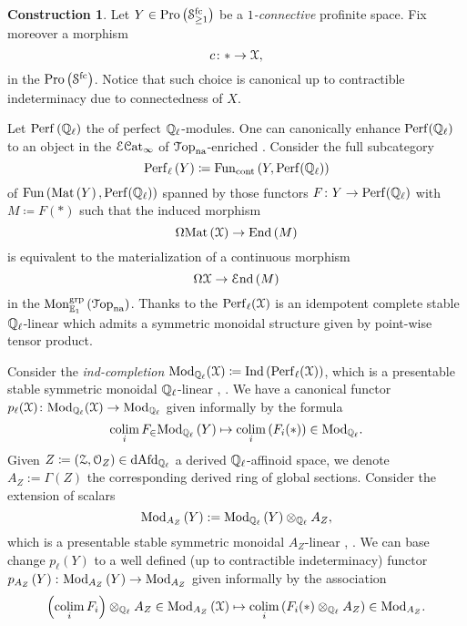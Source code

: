 \documentclass[10pt,a4paper]{amsart}
\numberwithin{equation}{subsection}
\theoremstyle{plain}
\theoremstyle{definition}
\newtheorem{construction}[theorem]{Construction}
\theoremstyle{remark}
\numberwithin{equation}{section}
\begin{document}
\begin{construction} \label{const:mod}
Let $Y \in \mathrm{Pro} \left( \mathcal S_{\geq 1}^{\mathrm{fc}} \right)$ be a \emph{$1$-connective} profinite space. Fix moreover a morphism
	\[
		c \colon * \to \mathcal X,
	\]
in the \infcat $\mathrm{Pro} \left( \mathcal S^{\mathrm{fc}} \right)$. Notice that such choice is canonical up to contractible indeterminacy due to connectedness of $X$.

Let $\mathrm{Perf} \left( \mathbb{Q}_{\ell} \right)$ the \infcat of perfect $\mathbb{Q}_{\ell}$-modules. One can canonically enhance $\mathrm{Perf}(\mathbb{Q}_{\ell})$ to an object in the \infcat $\mathcal E \mathcal{C}\mathrm{at}_\infty$ of $\mathcal{T} \mathrm{op}_{\mathrm{na}}$-enriched \infcats. Consider the full subcategory	
	\[
		\mathrm{Perf}_{\ell} \left( Y \right) \coloneqq \mathrm{Fun}_{\mathrm{cont}} \left( Y, \mathrm{Perf}(\mathbb{Q}_{\ell} ) \right)
	\]
of $\mathrm{Fun} \left( \mathrm{Mat} \left( Y \right) , \mathrm{Perf}( \mathbb{Q}_{\ell} ) \right)$ spanned by those functors $F \colon Y \to \mathrm{Perf}( \mathbb{Q}_{\ell})$ with $M \coloneqq F(*)$ such that the induced morphism
	\begin{equation} \label{eq:cont}
		\Omega \mathrm{Mat} \left(  \mathcal X \right) \to \mathrm{End} \left( M \right)
	\end{equation}
is equivalent to the materialization of a continuous morphism
	\[
		\Omega \mathcal X \to \mathcal E \mathrm{nd} \left( M \right)
	\]
in the \infcat $\mathrm{Mon}^{\mathrm{grp}}_{\mathbb E_1} \left( \mathcal{T} \mathrm{op}_{\mathrm{na}} \right)$. Thanks to \cite[Corollary 4.3.23]{me1} the \infcat
$\mathrm{Perf}_\ell(\mathcal X)$ is an idempotent complete stable $\mathbb{Q}_{\ell}$-linear \infcat which
admits a symmetric monoidal structure given by point-wise tensor product.

Consider the \emph{ind-completion} $\mathrm{Mod}_{\mathbb{Q}_{\ell}}(\mathcal X) \coloneqq \mathrm{Ind} \left(\mathrm{Perf}_\ell(\mathcal X)  \right)$, which is a presentable stable symmetric monoidal
$\mathbb{Q}_\ell$-linear \infcat, \cite[Corollary 4.3.25]{me1}. We have a canonical functor $p_{\ell} ( \mathcal X ) \colon \mathrm{Mod}_{\mathbb{Q}_\ell} (\mathcal X) \to \mathrm{Mod}_{\mathbb{Q}_\ell}$ given informally by the formula
	\[
		\operatorname*{colim}_i F_\in \mathrm{Mod}_{\mathbb{Q}_\ell} \left( Y \right) \mapsto \operatorname*{colim}_i \left( F_i(*)  \right) \in \mathrm{Mod}_{\mathbb{Q}_\ell}.
	\]
Given $Z \coloneqq (\mathcal Z, \mathcal{O}_Z) \in \mathrm{dAfd}_{\mathbb{Q}_\ell}$ a derived $\mathbb{Q}_{\ell}$-affinoid space, we denote
$A_Z := \Gamma \left( Z \right)$ the corresponding derived ring of global sections. Consider the extension of scalars \infcat 
	\[
		\mathrm{Mod}_{A_Z} \left( Y \right) := \mathrm{Mod}_{\mathbb{Q}_{\ell}} \left( Y \right) \otimes_{\mathbb{Q}_\ell} A_Z,
	\]
which is a presentable stable symmetric
monoidal $A_Z$-linear \infcat, \cite[Corollary 4.3.25]{me1}. We can base change $p_\ell (Y)$ to a well defined  (up to contractible indeterminacy) functor $ p_{A_Z} \left( Y \right)  \colon \mathrm{Mod}_{A_Z} \left( Y \right) \to \mathrm{Mod}_{A_Z}$ given informally by the
association
	\[
		\left( \operatorname*{colim}_i F_i \right) \otimes_{\mathbb{Q}_{\ell}} A_Z \in \mathrm{Mod}_{A_Z} \left( \mathcal X \right) \mapsto \operatorname*{colim}_i \left( F_i(*) \otimes_{\mathbb{Q}_\ell} A_Z \right) \in \mathrm{Mod}_{A_Z}.
	\]
\end{construction}
\end{document}
